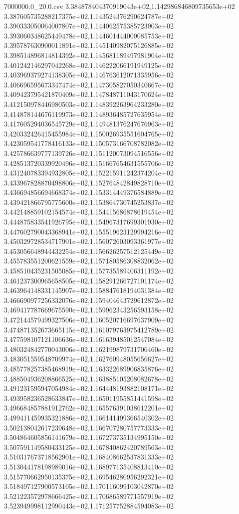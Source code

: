 \begin{filecontents*}{7000000.0_20.0.csv}
3.384878404370919043e+02,1.142986846809735653e+02
3.387605735288217375e+02,1.143524376290624787e+02
3.390333050064007807e+02,1.144062575385723903e+02
3.393060348625449478e+02,1.144601444009085753e+02
3.395787630900011891e+02,1.145140982075126885e+02
3.398514896814814392e+02,1.145681189497981904e+02
3.401242146297042268e+02,1.146222066191949125e+02
3.403969379274138305e+02,1.146763612071335956e+02
3.406696595673347474e+02,1.147305827050340667e+02
3.409423795421870409e+02,1.147848711043170624e+02
3.412150978446980503e+02,1.148392263964233280e+02
3.414878144676119973e+02,1.148936485727635954e+02
3.417605294036545729e+02,1.149481376247676963e+02
3.420332426415455984e+02,1.150026935551604765e+02
3.423059541778416133e+02,1.150573166708782082e+02
3.425786639777139726e+02,1.151120073094516556e+02
3.428513720339920496e+02,1.151667654631555706e+02
3.431240783394932805e+02,1.152215911242374204e+02
3.433967828870498806e+02,1.152764842849828710e+02
3.436694856694668374e+02,1.153314449376584889e+02
3.439421866795775600e+02,1.153864730745253837e+02
3.442148859102154574e+02,1.154415686878619454e+02
3.444875833541926795e+02,1.154967317699301930e+02
3.447602790043368941e+02,1.155519623129994216e+02
3.450329728534717901e+02,1.156072603093361977e+02
3.453056648944432254e+02,1.156626257512125449e+02
3.455783551200621559e+02,1.157180586308832062e+02
3.458510435231505085e+02,1.157735589406311192e+02
3.461237300965658505e+02,1.158291266727101174e+02
3.463964148331145907e+02,1.158847618194031384e+02
3.466690977256332076e+02,1.159404643729612872e+02
3.469417787669675590e+02,1.159962343256593158e+02
3.472144579499327506e+02,1.160520716697637909e+02
3.474871352673665115e+02,1.161079763975412789e+02
3.477598107121106636e+02,1.161639485012547084e+02
3.480324842770043006e+02,1.162199879731706460e+02
3.483051559548709974e+02,1.162760948055656627e+02
3.485778257385468919e+02,1.163322689906835876e+02
3.488504936208866525e+02,1.163885105208082678e+02
3.491231595947054984e+02,1.164448193882108171e+02
3.493958236528633847e+02,1.165011955851441598e+02
3.496684857881912762e+02,1.165576391038612201e+02
3.499411459935321886e+02,1.166141499366540302e+02
3.502138042617239648e+02,1.166707280757773333e+02
3.504864605856141679e+02,1.167273735134995150e+02
3.507591149580433125e+02,1.167840862420789563e+02
3.510317673718562901e+02,1.168408662537831333e+02
3.513044178198989016e+02,1.168977135408813410e+02
3.515770662950135375e+02,1.169546280956292321e+02
3.518497127900573105e+02,1.170116099103042870e+02
3.521223572978666425e+02,1.170686589771557919e+02
3.523949998112990443e+02,1.171257752884594083e+02

\end{filecontents*}
